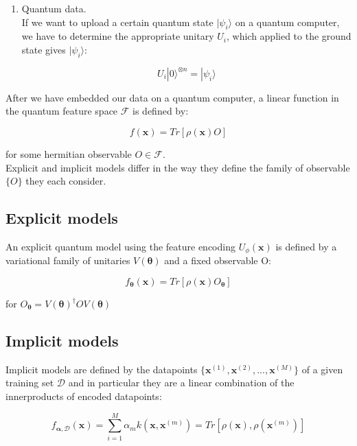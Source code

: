 \begin{enumerate}
    \item Quantum data.\\
    If we want to upload a certain quantum state $|\psi_i\rangle$ on a quantum computer, we have to determine
    the appropriate unitary $U_i$, which applied to the ground state gives $|\psi_i\rangle$:
    
    \begin{equation}
        U_i |0\rangle^{\otimes n} = |\psi_i\rangle
    \end{equation}
\end{enumerate}

After we have embedded our data on a quantum computer, a linear function in the quantum feature space 
$\mathcal{F}$ is defined by:

\begin{equation}
    f(\bm{x}) = Tr[\rho(\bm{x})O]
\end{equation}

for some hermitian observable $O \in \mathcal{F}$.\\
Explicit and implicit models differ in the way they define the family of observable 
$\{ O \}$ they each consider.

\subsection{Explicit models} 
\label{subsec:explicit}

An explicit quantum model using the feature encoding $U_{\phi}(\bm{x})$ is defined by a variational 
family of unitaries $V(\bm{\theta})$ and a fixed observable O:

\begin{equation}
    f_{\bm{\theta}}(\bm{x}) = Tr[\rho(\bm{x})O_{\bm{\theta}}]
\end{equation}

for $O_{\bm{\theta}} = V(\bm{\theta})^{\dagger} O V(\bm{\theta})$

\subsection{Implicit models} 
\label{subsec:implicit}

Implicit models are defined by the datapoints $\{ \bm{x}^{(1)}, \bm{x}^{(2)}, ..., \bm{x}^{(M)} \}$ of a given training set
$\mathcal{D}$ and in particular they are a linear combination of the innerproducts of encoded datapoints:

\begin{equation}
    f_{\bm{\alpha}, \mathcal{D}}(\bm{x}) = \sum_{i=1}^M \alpha_m k(\bm{x}, \bm{x}^{(m)}) = Tr[\rho(\bm{x}), \rho(\bm{x}^{(m)})]
\end{equation}

